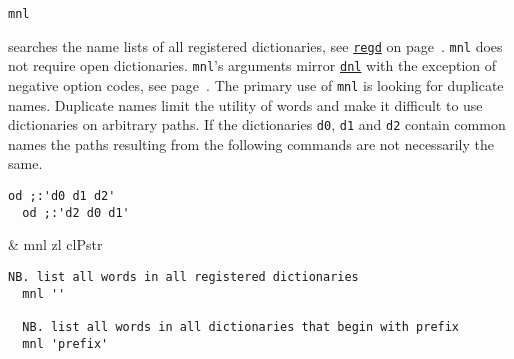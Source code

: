\hypertarget{il:mnl}{\texttt{mnl}} searches 
the name lists of all registered dictionaries, see \hyperlink{il:regd}{\texttt{regd}} on page~\pageref{ss:regd}.
 \texttt{mnl} does not require open dictionaries. 
\texttt{mnl}'s arguments mirror \hyperlink{il:dnl}{\texttt{dnl}} with the 
exception of negative option codes, see page~\pageref{ss:dnl}.  
The primary use of \texttt{mnl} is looking for duplicate names. Duplicate names limit the utility of words
and make it difficult to use dictionaries on arbitrary paths.
If the dictionaries \texttt{d0}, \texttt{d1} and \texttt{d2}
contain common names the paths resulting from the following commands 
are not necessarily the same.

\begin{lstlisting}[frame=single,framerule=0pt] 
  od ;:'d0 d1 d2' 
  od ;:'d2 d0 d1'   
\end{lstlisting}

\begin{wordhead}
\monad & mnl zl \argsep clPstr \\
\end{wordhead}
\begin{lstlisting}[frame=single,framerule=0pt]
  NB. list all words in all registered dictionaries
  mnl '' 

  NB. list all words in all dictionaries that begin with prefix
  mnl 'prefix' 
\end{lstlisting}

